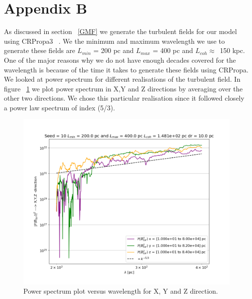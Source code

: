 \documentclass[12pt, a4 paper]{article}
\begin{document}
\section{Appendix B}\label{Appendix_B}
As discussed in section ~\ref{GMF} we generate the turbulent fields for our model using CRPropa3 ~\cite{CRPropa3_2016}. We the minimum and maximum wavelength we use to generate these fields are 
$L_{min}$ = 200 pc and $L_{max}$ = 400 pc and $L_{coh} \approx $~150 kpc. One of the major reasons why we do not have enough decades covered for the wavelength is because of the time it takes to generate these fields using CRPropa. 
We looked at power spectrum for different realisations of the turbulent field. In figure ~\ref{fig:PowerSpectrum} we plot power spectrum in X,Y and Z directions by averaging over the other two directions. We chose this particular realisation since it followed closely a power law spectrum of index (5/3). 
\begin{figure}[h!]
    \centering
    \includegraphics[width = 12cm]{Images/Jan3_Test_PowerSpectrum_vs_lambda_seed_10.png}
    \caption{Power spectrum plot versus wavelength for X, Y and Z direction.}
    \label{fig:PowerSpectrum}
\end{figure}

\iffalse
\end{document}
